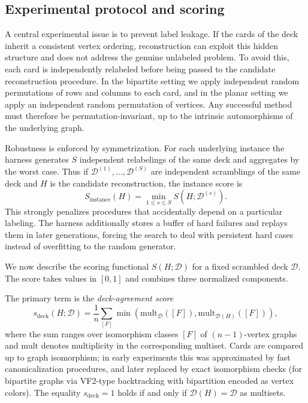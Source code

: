 \documentclass[11pt]{amsart}
\begin{document}
\subsection{Experimental protocol and scoring}

A central experimental issue is to prevent label leakage.
If the cards of the deck inherit a consistent vertex ordering, reconstruction can exploit this hidden structure and does not address the genuine unlabeled problem.
To avoid this, each card is independently relabeled before being passed to the candidate reconstruction procedure.
In the bipartite setting we apply independent random permutations of rows and columns to each card, and in the planar setting we apply an independent random permutation of vertices.
Any successful method must therefore be permutation-invariant, up to the intrinsic automorphisms of the underlying graph.

Robustness is enforced by symmetrization.
For each underlying instance the harness generates $S$ independent relabelings of the same deck and aggregates by the worst case.
Thus if $\mathcal{D}^{(1)},\dots,\mathcal{D}^{(S)}$ are independent scramblings of the same deck and $H$ is the candidate reconstruction, the instance score is
\[
S_{\mathrm{instance}}(H)
=
\min_{1\le s\le S} S(H;\mathcal{D}^{(s)}).
\]
This strongly penalizes procedures that accidentally depend on a particular labeling.
The harness additionally stores a buffer of hard failures and replays them in later generations, forcing the search to deal with persistent hard cases instead of overfitting to the random generator.

We now describe the scoring functional $S(H;\mathcal{D})$ for a fixed scrambled deck $\mathcal{D}$.
The score takes values in $[0,1]$ and combines three normalized components.

The primary term is the \emph{deck-agreement score}
\[
s_{\mathrm{deck}}(H;\mathcal{D})
=
\frac{1}{n}
\sum_{[F]}
\min \left(
\mathrm{mult}_{\mathcal{D}}([F]),
\mathrm{mult}_{\mathcal{D}(H)}([F])
\right),
\]
where the sum ranges over isomorphism classes $[F]$ of $(n-1)$-vertex graphs and $\mathrm{mult}$ denotes multiplicity in the corresponding multiset.
Cards are compared up to graph isomorphism; in early experiments this was approximated by fast canonicalization procedures, and later replaced by exact isomorphism checks (for bipartite graphs via VF2-type backtracking with bipartition encoded as vertex colors).
The equality $s_{\mathrm{deck}}=1$ holds if and only if $\mathcal{D}(H)=\mathcal{D}$ as multisets.
\end{document}

